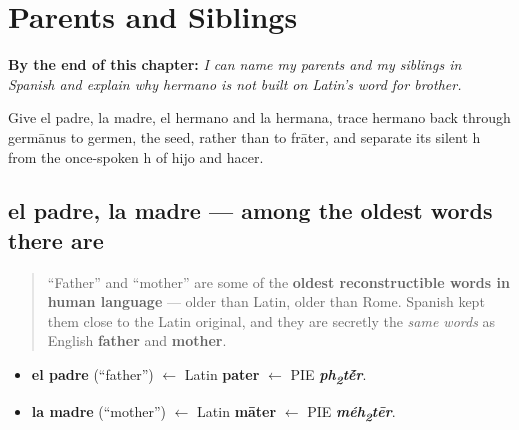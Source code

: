 
\chapter{Parents and Siblings}
\label{ch:spanish-family}

\begin{chapteropening}
\textbf{By the end of this chapter:} \emph{I can name my parents and my siblings in Spanish and explain why hermano is not built on Latin's word for brother.}

Give el padre, la madre, el hermano and la hermana, trace hermano back through germānus to germen, the seed, rather than to frāter, and separate its silent h from the once-spoken h of hijo and hacer.
\end{chapteropening}

\section[el padre, la madre]{el padre, la madre — among the oldest words there are}

\label{lesson:ES-C23-padre-madre}



\begin{quote}
\textquotedblleft{}Father\textquotedblright{} and \textquotedblleft{}mother\textquotedblright{} are some of the \textbf{oldest reconstructible words in human language} — older than Latin, older than Rome. Spanish kept them close to the Latin original, and they are secretly the \emph{same words} as English \textbf{father} and \textbf{mother}.
\end{quote}

\begin{cousinweb}
\begin{itemize}
\raggedright
  \item \textbf{el padre} (\textquotedblleft{}father\textquotedblright{}) $\leftarrow$ Latin \textbf{pater} $\leftarrow$ PIE \emph{\textbf{ph\textsubscript{2}t\'{\={e}}r}}.
  \item \textbf{la madre} (\textquotedblleft{}mother\textquotedblright{}) $\leftarrow$ Latin \textbf{māter} $\leftarrow$ PIE \emph{\textbf{méh\textsubscript{2}tēr}}.
\end{itemize}
\end{cousinweb}

